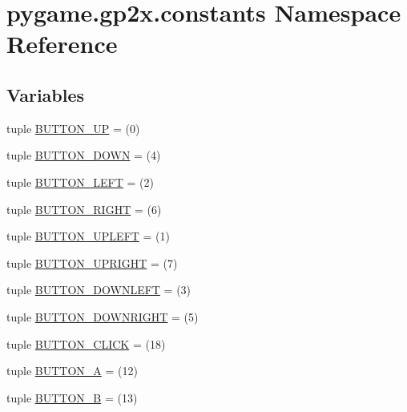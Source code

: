 \hypertarget{namespacepygame_1_1gp2x_1_1constants}{}\section{pygame.\+gp2x.\+constants Namespace Reference}
\label{namespacepygame_1_1gp2x_1_1constants}
\subsection*{Variables}
\begin{DoxyCompactItemize}
\item 
tuple \hyperlink{namespacepygame_1_1gp2x_1_1constants_a833d4b0d0249e531e2a69bde27d999a3}{B\+U\+T\+T\+O\+N\+\_\+\+UP} = (0)
\item 
tuple \hyperlink{namespacepygame_1_1gp2x_1_1constants_a1324af23fe4e0da57760d2110a835c6e}{B\+U\+T\+T\+O\+N\+\_\+\+D\+O\+WN} = (4)
\item 
tuple \hyperlink{namespacepygame_1_1gp2x_1_1constants_ae8471b7694f023a345a51c0b3248500b}{B\+U\+T\+T\+O\+N\+\_\+\+L\+E\+FT} = (2)
\item 
tuple \hyperlink{namespacepygame_1_1gp2x_1_1constants_a8a918bfdb5c645625eaf07269b974b1a}{B\+U\+T\+T\+O\+N\+\_\+\+R\+I\+G\+HT} = (6)
\item 
tuple \hyperlink{namespacepygame_1_1gp2x_1_1constants_a42272f9e45bdc4b752ae87758bd09237}{B\+U\+T\+T\+O\+N\+\_\+\+U\+P\+L\+E\+FT} = (1)
\item 
tuple \hyperlink{namespacepygame_1_1gp2x_1_1constants_a9b2af11d29eec3c8b4187d2af9fb52c1}{B\+U\+T\+T\+O\+N\+\_\+\+U\+P\+R\+I\+G\+HT} = (7)
\item 
tuple \hyperlink{namespacepygame_1_1gp2x_1_1constants_ab321dcb1c9724d535e8af8f6162f62c9}{B\+U\+T\+T\+O\+N\+\_\+\+D\+O\+W\+N\+L\+E\+FT} = (3)
\item 
tuple \hyperlink{namespacepygame_1_1gp2x_1_1constants_a0512692631059a652839ba929aaa07ef}{B\+U\+T\+T\+O\+N\+\_\+\+D\+O\+W\+N\+R\+I\+G\+HT} = (5)
\item 
tuple \hyperlink{namespacepygame_1_1gp2x_1_1constants_acc6fa4dfd0ebb89cf82b1d10fa6c86a5}{B\+U\+T\+T\+O\+N\+\_\+\+C\+L\+I\+CK} = (18)
\item 
tuple \hyperlink{namespacepygame_1_1gp2x_1_1constants_ab856932fffeaa4006398f0e8d58c1702}{B\+U\+T\+T\+O\+N\+\_\+A} = (12)
\item 
tuple \hyperlink{namespacepygame_1_1gp2x_1_1constants_a8a3904fa1cc045b26c83cffc3cc601c9}{B\+U\+T\+T\+O\+N\+\_\+B} = (13)
\item 

\end{DoxyCompactItemize}
